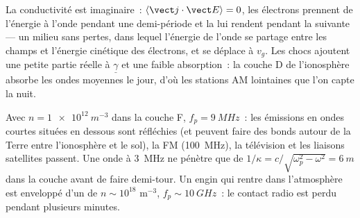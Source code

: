 \begin{remark}\label{rem:b2:waves-in-media:plasmaenergy}
La conductivité est imaginaire~: $\langle\vect j\cdot\vect E\rangle = 0$, les
électrons prennent de l'énergie à l'onde pendant une demi-période et la lui rendent
pendant la suivante --- un milieu sans pertes, dans lequel l'énergie de l'onde
se partage entre les champs et l'énergie cinétique des électrons, et
se déplace à $v_g$. Les chocs ajoutent une petite partie réelle à $\underline\gamma$ et une
faible absorption~: la couche D de l'ionosphère absorbe les ondes moyennes le
jour, d'où les stations AM lointaines que l'on capte la nuit.
\end{remark}

\begin{example}\label{ex:b2:waves-in-media:ionosphere}
Avec $n = \qty{1e12}{m^{-3}}$ dans la couche F, $f_p = \qty{9}{MHz}$~: les émissions
en ondes courtes situées en dessous sont réfléchies (et peuvent faire des bonds autour de la Terre
entre l'ionosphère et le sol), la FM (\qty{100}{MHz}), la télévision
et les liaisons satellites passent. Une onde à \qty{3}{MHz} ne pénètre que de
$1/\kappa = c/\sqrt{\omega_p^2 - \omega^2} = \qty{6}{m}$ dans la couche avant de
faire demi-tour. Un engin qui rentre dans l'atmosphère est enveloppé d'un
 de $n \sim 10^{18}$ m$^{-3}$, $f_p \sim \qty{10}{GHz}$~: le contact radio est
perdu pendant plusieurs minutes.
\end{example}

